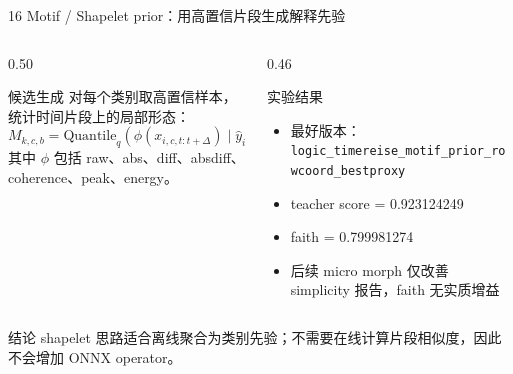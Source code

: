 \documentclass[aspectratio=169]{beamer}
\newcommand{\tightitems}{\setlength{\itemsep}{0.32em}}
\begin{document}
\begin{frame}{16 Motif / Shapelet prior：用高置信片段生成解释先验}
    \small
    \begin{columns}[T,onlytextwidth]
        \begin{column}{0.50\textwidth}
            \begin{block}{候选生成}
                对每个类别取高置信样本，统计时间片段上的局部形态：
                \[
                    M_{k,c,b}=\mathrm{Quantile}_{q}
                    \left(\phi(x_{i,c,t:t+\Delta})\mid \hat y_i=k\right)
                \]
                其中 $\phi$ 包括 raw、abs、diff、absdiff、coherence、peak、energy。
            \end{block}
        \end{column}
        \begin{column}{0.46\textwidth}
            \begin{block}{实验结果}
                \begin{itemize}
                    \tightitems
                    \item 最好版本：\texttt{logic\_timereise\_motif\_prior\_rowcoord\_bestproxy}
                    \item teacher score = 0.923124249
                    \item faith = 0.799981274
                    \item 后续 micro morph 仅改善 simplicity 报告，faith 无实质增益
                \end{itemize}
            \end{block}
        \end{column}
    \end{columns}
    \begin{block}{结论}
        shapelet 思路适合离线聚合为类别先验；不需要在线计算片段相似度，因此不会增加 ONNX operator。
    \end{block}
\end{frame}
\end{document}

